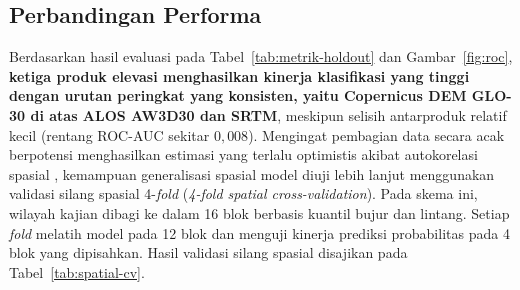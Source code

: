 \documentclass[12pt]{article}
\begin{document}
\subsection{Perbandingan Performa}

Berdasarkan hasil evaluasi pada Tabel~\ref{tab:metrik-holdout} dan
Gambar~\ref{fig:roc}, \textbf{ketiga produk elevasi menghasilkan kinerja
klasifikasi yang tinggi dengan urutan peringkat yang konsisten, yaitu
Copernicus DEM GLO-30 di atas ALOS AW3D30 dan SRTM}, meskipun selisih
antarproduk relatif kecil (rentang ROC-AUC sekitar $0{,}008$). Mengingat
pembagian data secara acak berpotensi menghasilkan estimasi yang terlalu
optimistis akibat autokorelasi spasial \cite{roberts2017}, kemampuan
generalisasi spasial model diuji lebih lanjut menggunakan validasi silang
spasial 4-\textit{fold} (\textit{4-fold spatial cross-validation}). Pada skema
ini, wilayah kajian dibagi ke dalam 16 blok berbasis kuantil bujur dan
lintang. Setiap \textit{fold} melatih model pada 12 blok dan menguji kinerja
prediksi probabilitas pada 4 blok yang dipisahkan. Hasil validasi silang
spasial disajikan pada Tabel~\ref{tab:spatial-cv}.
\end{document}
